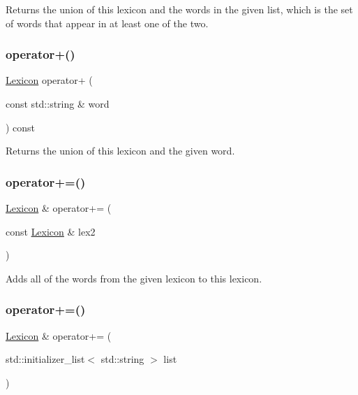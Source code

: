 Returns the union of this lexicon and the words in the given list, which is the set of words that appear in at least one of the two. 

\mbox{\label{classLexicon_a44774af5311cf2c8fd054ecf8ff8e76b}} 
\subsubsection{\texorpdfstring{operator+()}{operator+()}\hspace{0.1cm}{\footnotesize\ttfamily [3/3]}}
{\footnotesize\ttfamily \mbox{\hyperlink{classLexicon}{Lexicon}} operator+ (\begin{DoxyParamCaption}\item[{const std\+::string \&}]{word }\end{DoxyParamCaption}) const}



Returns the union of this lexicon and the given word. 

\mbox{\label{classLexicon_afa70421c28007f127e7c4b24666ecc3a}} 
\subsubsection{\texorpdfstring{operator+=()}{operator+=()}\hspace{0.1cm}{\footnotesize\ttfamily [1/3]}}
{\footnotesize\ttfamily \mbox{\hyperlink{classLexicon}{Lexicon}} \& operator+= (\begin{DoxyParamCaption}\item[{const \mbox{\hyperlink{classLexicon}{Lexicon}} \&}]{lex2 }\end{DoxyParamCaption})}



Adds all of the words from the given lexicon to this lexicon. 

\mbox{\label{classLexicon_a3080ac30a072160945adc5f860ca1785}} 
\subsubsection{\texorpdfstring{operator+=()}{operator+=()}\hspace{0.1cm}{\footnotesize\ttfamily [2/3]}}
{\footnotesize\ttfamily \mbox{\hyperlink{classLexicon}{Lexicon}} \& operator+= (\begin{DoxyParamCaption}\item[{std\+::initializer\+\_\+list$<$ std\+::string $>$}]{list }\end{DoxyParamCaption})}



